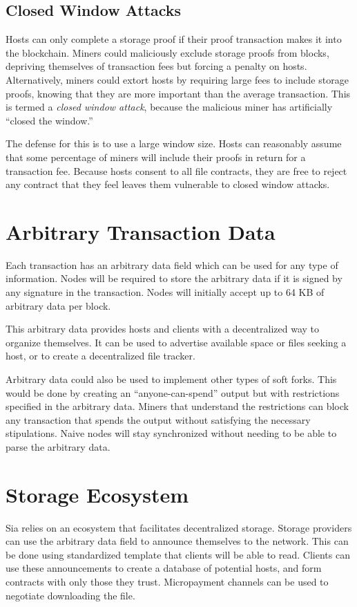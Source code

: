 \documentclass[twocolumn]{article}
\begin{document}
\subsection{Closed Window Attacks}
Hosts can only complete a storage proof if their proof transaction makes it into the blockchain.
Miners could maliciously exclude storage proofs from blocks, depriving themselves of transaction fees but forcing a penalty on hosts.
Alternatively, miners could extort hosts by requiring large fees to include storage proofs, knowing that they are more important than the average transaction.
This is termed a \textit{closed window attack}, because the malicious miner has artificially ``closed the window.''

The defense for this is to use a large window size.
Hosts can reasonably assume that some percentage of miners will include their proofs in return for a transaction fee.
Because hosts consent to all file contracts, they are free to reject any contract that they feel leaves them vulnerable to closed window attacks.

\section{Arbitrary Transaction Data}
Each transaction has an arbitrary data field which can be used for any type of information.
Nodes will be required to store the arbitrary data if it is signed by any signature in the transaction.
Nodes will initially accept up to 64 KB of arbitrary data per block.

This arbitrary data provides hosts and clients with a decentralized way to organize themselves.
It can be used to advertise available space or files seeking a host, or to create a decentralized file tracker.

Arbitrary data could also be used to implement other types of soft forks.
This would be done by creating an ``anyone-can-spend'' output but with restrictions specified in the arbitrary data.
Miners that understand the restrictions can block any transaction that spends the output without satisfying the necessary stipulations.
Naive nodes will stay synchronized without needing to be able to parse the arbitrary data.

\section{Storage Ecosystem}
Sia relies on an ecosystem that facilitates decentralized storage.
Storage providers can use the arbitrary data field to announce themselves to the network.
This can be done using standardized template that clients will be able to read.
Clients can use these announcements to create a database of potential hosts, and form contracts with only those they trust.
Micropayment channels \cite{mpc} can be used to negotiate downloading the file. %
\end{document}
